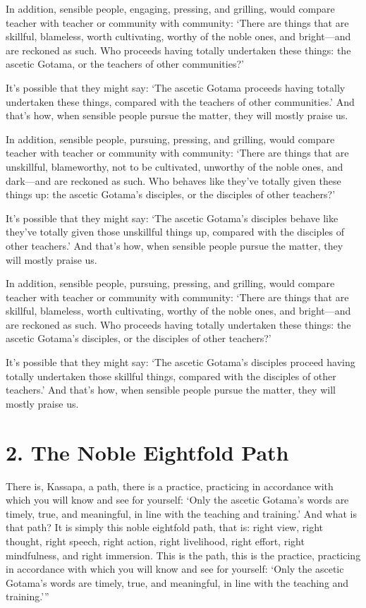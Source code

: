 \documentclass[12pt,openany]{book}%
\begin{document}
In addition, sensible people, engaging, pressing, and grilling, would compare teacher with teacher or community with community: ‘There are things that are skillful, blameless, worth cultivating, worthy of the noble ones, and bright—and are reckoned as such. Who proceeds having totally undertaken these things: the ascetic Gotama, or the teachers of other communities?’ 

It’s possible that they might say: ‘The ascetic Gotama proceeds having totally undertaken these things, compared with the teachers of other communities.’ And that’s how, when sensible people pursue the matter, they will mostly praise us. 

In addition, sensible people, pursuing, pressing, and grilling, would compare teacher with teacher or community with community: ‘There are things that are unskillful, blameworthy, not to be cultivated, unworthy of the noble ones, and dark—and are reckoned as such. Who behaves like they’ve totally given these things up: the ascetic Gotama’s disciples, or the disciples of other teachers?’ 

It’s possible that they might say: ‘The ascetic Gotama’s disciples behave like they’ve totally given those unskillful things up, compared with the disciples of other teachers.’ And that’s how, when sensible people pursue the matter, they will mostly praise us. 

In addition, sensible people, pursuing, pressing, and grilling, would compare teacher with teacher or community with community: ‘There are things that are skillful, blameless, worth cultivating, worthy of the noble ones, and bright—and are reckoned as such. Who proceeds having totally undertaken these things: the ascetic Gotama’s disciples, or the disciples of other teachers?’ 

It’s possible that they might say: ‘The ascetic Gotama’s disciples proceed having totally undertaken those skillful things, compared with the disciples of other teachers.’ And that’s how, when sensible people pursue the matter, they will mostly praise us. 

\section*{2. The Noble Eightfold Path }

There is, Kassapa, a path, there is a practice, practicing in accordance with which you will know and see for yourself: ‘Only the ascetic Gotama’s words are timely, true, and meaningful, in line with the teaching and training.’ And what is that path? It is simply this noble eightfold path, that is: right view, right thought, right speech, right action, right livelihood, right effort, right mindfulness, and right immersion. This is the path, this is the practice, practicing in accordance with which you will know and see for yourself: ‘Only the ascetic Gotama’s words are timely, true, and meaningful, in line with the teaching and training.’” 
\end{document}
